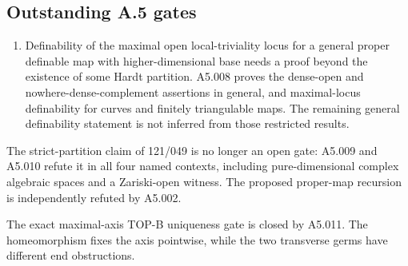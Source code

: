 \subsection*{Outstanding A.5 gates}
\begin{enumerate}
\item Definability of the maximal open local-triviality locus for a
general proper definable map with higher-dimensional base needs a
proof beyond the existence of some Hardt partition.  A5.008 proves
the dense-open and nowhere-dense-complement assertions in general,
and maximal-locus definability for curves and finitely triangulable
maps.  The remaining general definability statement is not inferred
from those restricted results.
\end{enumerate}
The strict-partition claim of 121/049 is no longer an open gate:
A5.009 and A5.010 refute it in all four named contexts, including
pure-dimensional complex algebraic spaces and a Zariski-open
witness.  The proposed proper-map recursion is independently
refuted by A5.002.

The exact maximal-axis TOP-B uniqueness gate is closed by A5.011.
The homeomorphism fixes the axis pointwise, while the two transverse
germs have different end obstructions.

